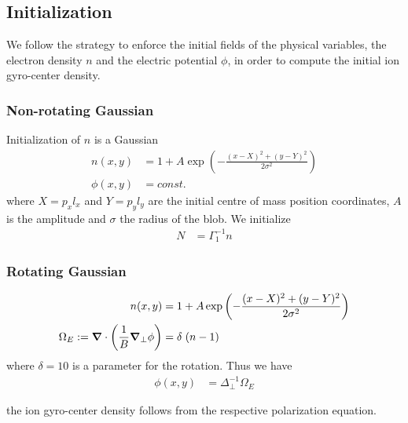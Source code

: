 \subsection{Initialization}
We follow the strategy to enforce the initial fields of the physical variables, the electron density \(n\) and the electric potential \(\phi\), in order to compute the initial ion gyro-center density.
\subsubsection{Non-rotating Gaussian}
Initialization of $n$ is a Gaussian 
\begin{align}
    n(x,y) &= 1 + A\exp\left( -\frac{(x-X)^2 + (y-Y)^2}{2\sigma^2}\right) \\
    \phi(x,y)&=const.
\end{align}
where $X = p_x l_x$ and $Y=p_yl_y$ are the initial centre of mass position coordinates, $A$ is the amplitude and $\sigma$ the
radius of the blob.
We initialize 
\begin{align}
    N &= \Gamma_1^{-1} n 
\end{align}
\subsubsection{Rotating Gaussian}
\begin{align}
    n(x,y) &= 1 + A\exp\left( -\frac{(x-X)^2 + (y-Y)^2}{2\sigma^2}\right) \\
    \Omega_E:= \vec{\nabla} \cdot \left(\frac{1}{B} \vec{\nabla}_\perp \phi\right) &= \delta \hspace{1mm} (n-1)
\end{align}
where \(\delta = 10\) is a parameter for the rotation.
Thus we have
\begin{align}
  \phi(x,y) &= \Delta_\perp^{-1} \Omega_E 
\end{align}

the ion gyro-center density follows from the respective polarization equation.

